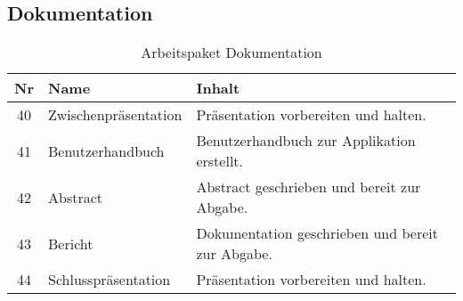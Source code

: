 \subsection{Dokumentation}
\begin{table}[H]
\begin{tabularx}{\textwidth}{ c | l | X }
\textbf{Nr} & \textbf{Name} & \textbf{Inhalt} \\ \hline
40 & Zwischenpräsentation & Präsentation vorbereiten und halten.\\ \hline
41 & Benutzerhandbuch & Benutzerhandbuch zur Applikation erstellt.\\ \hline
42 & Abstract & Abstract geschrieben und bereit zur Abgabe.\\ \hline
43 & Bericht & Dokumentation geschrieben und bereit zur Abgabe.\\ \hline
44 & Schlusspräsentation & Präsentation vorbereiten und halten.\\ 
\end{tabularx}
\caption{Arbeitspaket Dokumentation}
\end{table}